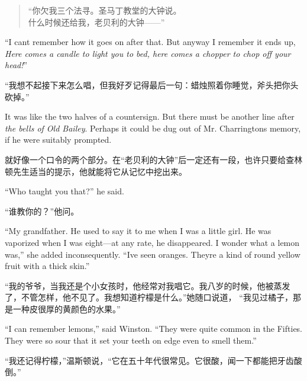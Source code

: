 \begin{paracol}{2}
\switchcolumn

\begin{quotation}
 \noindent ``你欠我三个法寻。圣马丁教堂的大钟说。\\
  什么时候还给我，老贝利的大钟——''
\end{quotation}

\switchcolumn*

``I can\textquotesingle t remember how it goes on after that. But anyway
I remember it ends up, \emph{Here comes a candle to light you to bed,
here comes a chopper to chop off your head!}''

\switchcolumn

``我想不起接下来怎么唱，但我好歹记得最后一句：蜡烛照着你睡觉，斧头把你头砍掉。''

\switchcolumn*

It was like the two halves of a countersign. But there must be another
line after \emph{the bells of Old Bailey}. Perhaps it could be dug out
of Mr. Charrington\textquotesingle s memory, if he were suitably
prompted.

\switchcolumn

就好像一个口令的两个部分。在``老贝利的大钟''后一定还有一段，也许只要给查林顿先生适当的提示，他就能将它从记忆中挖出来。

\switchcolumn*

``Who taught you that?'' he said.

\switchcolumn

``谁教你的？''他问。

\switchcolumn*

``My grandfather. He used to say it to me when I was a little girl. He
was vaporized when I was eight---at any rate, he disappeared. I wonder
what a lemon was,'' she added inconsequently. ``I\textquotesingle ve seen
oranges. They\textquotesingle re a kind of round yellow fruit with a
thick skin.''

\switchcolumn

``我的爷爷，当我还是个小女孩时，他经常对我唱它。我八岁的时候，他被蒸发了，不管怎样，他不见了。我想知道柠檬是什么。''她随口说道，
``我见过橘子，那是一种皮很厚的黄颜色的水果。''

\switchcolumn*

``I can remember lemons,'' said Winston. ``They were quite common in the
Fifties. They were so sour that it set your teeth on edge even to smell
them.''

\switchcolumn

``我还记得柠檬，''温斯顿说，``它在五十年代很常见。它很酸，闻一下都能把牙齿酸倒。''


\end{paracol}
